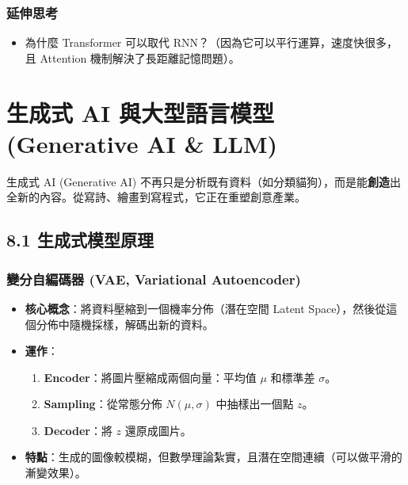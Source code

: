 \documentclass[
  letterpaper,
  DIV=11,
  numbers=noendperiod]{scrreprt}
\providecommand{\tightlist}{%
  \setlength{\itemsep}{0pt}\setlength{\parskip}{0pt}}
\begin{document}
\section{延伸思考}\label{ux5ef6ux4f38ux601dux8003-6}

\begin{itemize}
\tightlist
\item
  為什麼 Transformer 可以取代 RNN？（因為它可以平行運算，速度快很多，且
  Attention 機制解決了長距離記憶問題）。
\end{itemize}

\part{生成式 AI 與大型語言模型 (Generative AI \&
LLM)}\label{ux751fux6210ux5f0f-ai-ux8207ux5927ux578bux8a9eux8a00ux6a21ux578b-generative-ai-llm}

生成式 AI (Generative AI)
不再只是分析既有資料（如分類貓狗），而是能\textbf{創造}出全新的內容。從寫詩、繪畫到寫程式，它正在重塑創意產業。

\chapter{8.1 生成式模型原理}\label{sec-generative-models}

\section{變分自編碼器 (VAE, Variational Autoencoder)}\label{sec-vae}

\begin{itemize}
\tightlist
\item
  \textbf{核心概念}：將資料壓縮到一個機率分佈（潛在空間 Latent
  Space），然後從這個分佈中隨機採樣，解碼出新的資料。
\item
  \textbf{運作}：

  \begin{enumerate}
  \def\labelenumi{\arabic{enumi}.}
  \tightlist
  \item
    \textbf{Encoder}：將圖片壓縮成兩個向量：平均值 \(\mu\) 和標準差
    \(\sigma\)。
  \item
    \textbf{Sampling}：從常態分佈 \(N(\mu, \sigma)\) 中抽樣出一個點
    \(z\)。
  \item
    \textbf{Decoder}：將 \(z\) 還原成圖片。
  \end{enumerate}
\item
  \textbf{特點}：生成的圖像較模糊，但數學理論紮實，且潛在空間連續（可以做平滑的漸變效果）。
\end{itemize}
\end{document}
